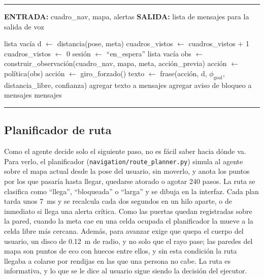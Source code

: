 \begin{center}
\label{alg:dev_nav}
\end{center}
\vspace{-1.8cm}
\rule{\textwidth}{0.4pt}
\vspace{-0.9cm}
\begin{algorithmic}[1]

\Statex \textbf{ENTRADA:} cuadro\_nav, mapa, alertas
\Statex \textbf{SALIDA:} lista de mensajes para la salida de voz

\Statex
{}
    \State \Return lista vacía
\EndIf
\State d $\gets$ distancia(pose, meta)
    \State cuadros\_vistos $\gets$ cuadros\_vistos + 1
\Else
    \State cuadros\_vistos $\gets$ 0
\EndIf
{}
    \State sesión $\gets$ ``en\_espera''
    \State {}
\EndIf
{}
    \State \Return lista vacía
\EndIf
\State obs $\gets$ construir\_observación(cuadro\_nav, mapa, meta, acción\_previa)
\State acción $\gets$ política(obs)
    \State acción $\gets$ giro\_forzado() 
\EndIf
\State texto $\gets$ frase(acción, d, $\phi_{\text{goal}}$, distancia\_libre, confianza)
    \State agregar texto a mensajes
\EndIf
{}
    \State agregar aviso de bloqueo a mensajes
\EndIf
\State \Return mensajes

\end{algorithmic}
\vspace{-0.9cm}
\rule{\textwidth}{0.4pt}

\subsection{Planificador de ruta}

Como el agente decide solo el siguiente paso, no es fácil saber hacia dónde va. Para
verlo, el planificador (\texttt{navigation/route\_planner.py}) simula al agente sobre el
mapa actual desde la pose del usuario, sin moverlo, y anota los puntos por los que
pasaría hasta llegar, quedarse atorado o agotar 240 pasos. La ruta se clasifica como
``llega'', ``bloqueada'' o ``larga'' y se dibuja en la interfaz. Cada plan tarda unos
7~ms y se recalcula cada dos segundos en un hilo aparte, o de inmediato si llega una
alerta crítica. Como las puertas quedan registradas sobre la pared, cuando la meta cae en
una celda ocupada el planificador la mueve a la celda libre más cercana. Además, para
avanzar exige que quepa el cuerpo del usuario, un disco de 0.12~m de radio, y no solo
que el rayo pase; las paredes del mapa son puntos de eco con huecos entre ellos, y sin
esta condición la ruta llegaba a colarse por rendijas en las que una persona no cabe. La
ruta es informativa, y lo que se le dice al usuario sigue siendo la decisión del
ejecutor.

